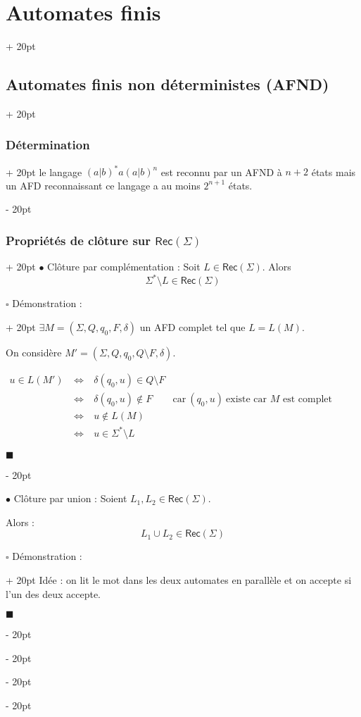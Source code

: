 \documentclass[a4paper, 12pt, twoside]{article}
\newcommand{\lr}[1]{\left( #1 \right)}
\newcommand{\ssi}{\ \Leftrightarrow \ }
\newcommand{\ind}[1][20pt]{\advance\leftskip + #1}
\newcommand{\deind}[1][20pt]{\advance\leftskip - #1}
\newenvironment{indt}[2][20pt]{#2 \par \ind[#1]}{\par \deind} %
\newenvironment{proof}[1][{Démonstration :}]{\begin{indt}{$\square$ #1}}{$\blacksquare$ \end{indt}}
\newcommand{\Rec}[1]{\mathsf{Rec}\!\lr{#1}}
\begin{document}
\begin{indt}{\section{Automates finis}}
\begin{indt}{\subsection{Automates finis non déterministes (AFND)}}
\begin{indt}{\subsubsection{Détermination}}
                 le langage $(a|b)^*a(a|b)^n$ est reconnu par un AFND à $n + 2$ états mais un AFD reconnaissant ce langage a au moins $2^{n + 1}$ états.
            \end{indt}

            \vspace{12pt}
            
            \begin{indt}{\subsubsection{Propriétés de clôture sur $\Rec \Sigma$}}
                $\bullet$ Clôture par complémentation : Soit $L \in \Rec \Sigma$.
                Alors
                \[
                    \Sigma^* \setminus L \in \Rec \Sigma
                \]

                \begin{proof}
                    $\exists M = (\Sigma, Q, q_0, F, \delta)$ un AFD complet tel que $L = L(M)$.

                    On considère $M' = (\Sigma, Q, q_0, Q \setminus F, \delta)$.

                    \(
                        \begin{array}{rcll}
                            u \in L(M')
                            &\ssi& \delta(q_0, u) \in Q \setminus F
                            \\
                            &\ssi& \delta(q_0, u) \notin F
                            & \text{car}\ (q_0, u)\  \text{existe car $M$ est complet}
                            \\
                            &\ssi& u \notin L(M)
                            \\
                            &\ssi& u \in \Sigma^* \setminus L
                        \end{array}
                    \)

                \end{proof}

                \vspace{12pt}
                
                $\bullet$ Clôture par union : Soient $L_1, L_2 \in \Rec \Sigma$.

                Alors :
                \[
                    L_1 \cup L_2 \in \Rec \Sigma
                \]

                \begin{proof}
                    Idée : on lit le mot dans les deux automates en parallèle et on accepte si l'un des deux accepte.


\end{proof}
\end{indt}
\end{indt}
\end{indt}
\end{document}
